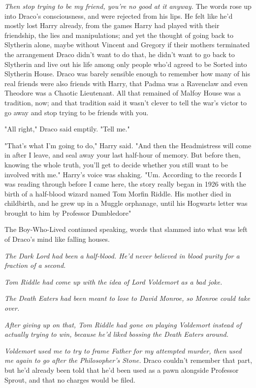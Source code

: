 \emph{Then stop trying to be my friend, you're no good at it anyway.} The words
rose up into Draco's consciousness, and were rejected from his lips. He felt
like he'd mostly lost Harry already, from the games Harry had played with their
friendship, the lies and manipulations; and yet the thought of going back to
Slytherin alone, maybe without Vincent and Gregory if their mothers terminated
the arrangement{\el} Draco didn't want to do that, he didn't want to go back
to Slytherin and live out his life among only people who'd agreed to be Sorted
into Slytherin House. Draco was barely sensible enough to remember how many of
his real friends were also friends with Harry, that Padma was a Ravenclaw and
even Theodore was a Chaotic Lieutenant. All that remained of Malfoy House was a
tradition, now; and that tradition said it wasn't clever to tell the war's
victor to go away and stop trying to be friends with you.

"All right," Draco said emptily. "Tell me."

"That's what I'm going to do," Harry said. "And then the Headmistress will come
in after I leave, and seal away your last half-hour of memory. But before then,
knowing the whole truth, you'll get to decide whether you still want to be
involved with me." Harry's voice was shaking. "Um. According to the records I
was reading through before I came here, the story really began in 1926 with the
birth of a half-blood wizard named Tom Morfin Riddle. His mother died in
childbirth, and he grew up in a Muggle orphanage, until his Hogwarts letter was
brought to him by Professor Dumbledore{\el}"

The Boy-Who-Lived continued speaking, words that slammed into what was left of
Draco's mind like falling houses.

\emph{The Dark Lord had been a half-blood. He'd never believed in blood purity
for a fraction of a second.}

\emph{Tom Riddle had come up with the idea of Lord Voldemort as a bad joke.}

\emph{The Death Eaters had been meant to lose to David Monroe, so Monroe could
take over.}

\emph{After giving up on that, Tom Riddle had gone on playing Voldemort instead
of actually trying to win, because he'd liked bossing the Death Eaters around.}

\emph{Voldemort used me to try to frame Father for my attempted murder, then
used me again to go after the Philosopher's Stone.} Draco couldn't remember
that part, but he'd already been told that he'd been used as a pawn alongside
Professor Sprout, and that no charges would be filed.


